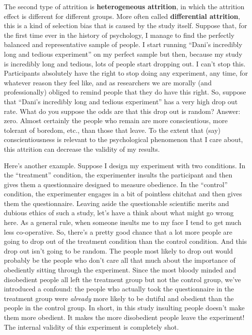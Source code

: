 \documentclass[
]{book}
\begin{document}
The second type of attrition is {\textbf{heterogeneous attrition}}, in which the attrition effect is different for different groups. More often called {\textbf{differential attrition}}, this is a kind of selection bias that is caused by the study itself. Suppose that, for the first time ever in the history of psychology, I manage to find the perfectly balanced and representative sample of people. I start running ``Dani's incredibly long and tedious experiment'' on my perfect sample but then, because my study is incredibly long and tedious, lots of people start dropping out. I can't stop this. Participants absolutely have the right to stop doing any experiment, any time, for whatever reason they feel like, and as researchers we are morally (and professionally) obliged to remind people that they do have this right. So, suppose that ``Dani's incredibly long and tedious experiment'' has a very high drop out rate. What do you suppose the odds are that this drop out is random? Answer: zero. Almost certainly the people who remain are more conscientious, more tolerant of boredom, etc., than those that leave. To the extent that (say) conscientiousness is relevant to the psychological phenomenon that I care about, this attrition can decrease the validity of my results.

Here's another example. Suppose I design my experiment with two conditions. In the ``treatment'' condition, the experimenter insults the participant and then gives them a questionnaire designed to measure obedience. In the ``control'' condition, the experimenter engages in a bit of pointless chitchat and then gives them the questionnaire. Leaving aside the questionable scientific merits and dubious ethics of such a study, let's have a think about what might go wrong here. As a general rule, when someone insults me to my face I tend to get much less co-operative. So, there's a pretty good chance that a lot more people are going to drop out of the treatment condition than the control condition. And this drop out isn't going to be random. The people most likely to drop out would probably be the people who don't care all that much about the importance of obediently sitting through the experiment. Since the most bloody minded and disobedient people all left the treatment group but not the control group, we've introduced a confound: the people who actually took the questionnaire in the treatment group were \emph{already} more likely to be dutiful and obedient than the people in the control group. In short, in this study insulting people doesn't make them more obedient. It makes the more disobedient people leave the experiment! The internal validity of this experiment is completely shot.
\end{document}
